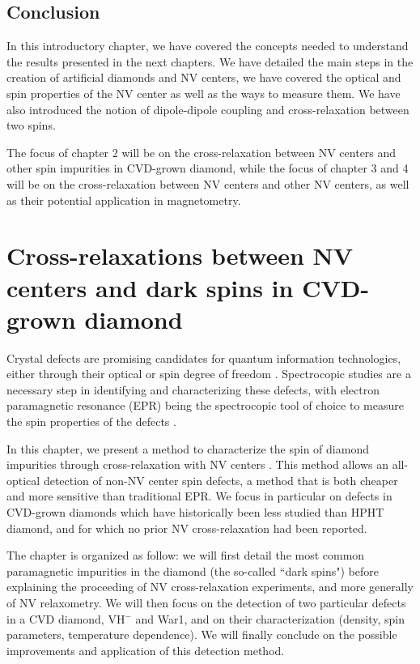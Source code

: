 \documentclass[a4paper, 11pt]{report}
\begin{document}
\section{Conclusion}

In this introductory chapter, we have covered the concepts needed to understand the results presented in the next chapters. We have detailed the main steps in the creation of artificial diamonds and NV centers, we have covered the optical and spin properties of the NV center as well as the ways to measure them. We have also introduced the notion of dipole-dipole coupling and cross-relaxation between two spins.

The focus of chapter 2 will be on the cross-relaxation between NV centers and other spin impurities in CVD-grown diamond, while the focus of chapter 3 and 4 will be on the cross-relaxation between NV centers and other NV centers, as well as their potential application in magnetometry.

\chapter{Cross-relaxations between NV centers and dark spins in CVD-grown diamond}
Crystal defects are promising candidates for quantum information technologies, either through their optical or spin degree of freedom \citep{aharonovich2016solid, atature2018material, bassett2019quantum}. Spectrocopic studies are a necessary step in identifying and characterizing these defects, with electron paramagnetic resonance (EPR) being the spectrocopic tool of choice to measure the spin properties of the defects \citep{newton2007epr}. 

In this chapter, we present a method to characterize the spin of diamond impurities through cross-relaxation with NV centers \citep{hall2016detection,pellet2021optical}. This method allows an all-optical detection of non-NV center spin defects, a method that is both cheaper and more sensitive than traditional EPR. We focus in particular on defects in CVD-grown diamonds which have historically been less studied than HPHT diamond, and for which no prior NV cross-relaxation had been reported. 

The chapter is organized as follow: we will first detail the most common paramagnetic impurities in the diamond (the so-called ``dark spins") before explaining the proceeding of NV cross-relaxation experiments, and more generally of NV relaxometry. We will then focus on the detection of two particular defects in a CVD diamond, VH$^-$ and War1, and on their characterization (density, spin parameters, temperature dependence). We will finally conclude on the possible improvements and application of this detection method.
\end{document}
